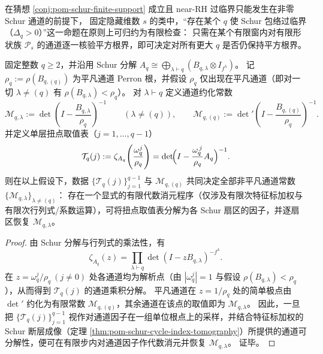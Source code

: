 \begin{corollary}\label{cor:pom-schur-near-rh-finite-check}
在猜想 \ref{conj:pom-schur-finite-support} 成立且 near-RH 过临界只能发生在非零 Schur 通道的前提下，
固定隐藏维数 \(s\) 的类中，“存在某个 \(q\) 使 Schur 包络过临界（\(\Delta_q>0\)）”这一命题在原则上可归约为有限检查：
只需在某个有限窗内对有限形状族 \(\mathcal{P}_s\) 的通道逐一核验平方根界，即可决定对所有更大 \(q\) 是否仍保持平方根界。
\end{corollary}

\begin{theorem}\label{thm:pom-torsion-schur-dual-microscope}
固定整数 \(q\ge2\)，并沿用 Schur 分解
\(
A_q\cong\bigoplus_{\lambda\vdash q}(B_{q,\lambda}\otimes I_{f^\lambda})
\)。
记 \(\rho_q:=\rho(B_{q,(q)})\) 为平凡通道 Perron 根，并假设 \(\rho_q\) 仅出现在平凡通道（即对一切 \(\lambda\neq(q)\) 有 \(\rho(B_{q,\lambda})<\rho_q\)）。
对 \(\lambda\vdash q\) 定义通道约化常数
\[
\mathcal{M}_{q,\lambda}
:=
\det\!\left(I-\frac{B_{q,\lambda}}{\rho_q}\right)^{-1}\qquad(\lambda\neq(q)),
\qquad
\mathcal{M}_{q,(q)}
:=
\det\nolimits'\!\left(I-\frac{B_{q,(q)}}{\rho_q}\right)^{-1}.
\]
并定义单层扭点取值表（\(j=1,\dots,q-1\)）
\[
\mathcal{T}_q(j)
:=
\zeta_{A_q}\!\left(\frac{\omega_q^j}{\rho_q}\right)
=
\det\!\Bigl(I-\frac{\omega_q^{\,j}}{\rho_q}A_q\Bigr)^{-1}.
\]
则在以上假设下，数据 \(\{\mathcal{T}_q(j)\}_{j=1}^{q-1}\) 与 \(\mathcal{M}_{q,(q)}\) 共同决定全部非平凡通道常数 \(\{\mathcal{M}_{q,\lambda}\}_{\lambda\neq(q)}\)：
存在一个显式的有限代数消元程序（仅涉及有限次特征标加权与有限次行列式/系数运算），可将扭点取值表分解为各 Schur 扇区的因子，并逐扇区恢复 \(\mathcal{M}_{q,\lambda}\)。
\end{theorem}
\begin{proof}
由 Schur 分解与行列式的乘法性，有
\[
\zeta_{A_q}(z)
=\prod_{\lambda\vdash q}\det(I-zB_{q,\lambda})^{-f^\lambda}.
\]
在 \(z=\omega_q^j/\rho_q\ (j\neq0)\) 处各通道均为解析点（由 \(|\omega_q^j|=1\) 与假设 \(\rho(B_{q,\lambda})<\rho_q\)），从而得到 \(\mathcal{T}_q(j)\) 的通道乘积分解。
平凡通道在 \(z=1/\rho_q\) 处的简单极点由 \(\det'\) 约化为有限常数 \(\mathcal{M}_{q,(q)}\)，其余通道在该点的取值即为 \(\mathcal{M}_{q,\lambda}\)。
因此，一旦把 \(\{\mathcal{T}_q(j)\}_{j=1}^{q-1}\) 视作对通道因子在一组单位根点上的采样，并结合特征标加权的 Schur 断层成像（定理 \ref{thm:pom-schur-cycle-index-tomography}）所提供的通道可分解性，便可在有限步内对通道因子作代数消元并恢复 \(\mathcal{M}_{q,\lambda}\)。
证毕。
\end{proof}
